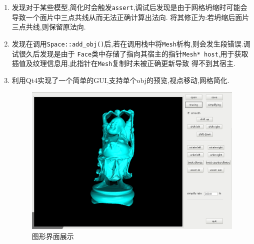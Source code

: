 \begin{enumerate}
\begin{figure}[H]
    \end{figure}

  \item 发现对于某些模型,简化时会触发\verb|assert|,调试后发现是由于网格坍缩时可能会导致一个面片中三点共线从而无法正确计算出法向.
    将其修正为:若坍缩后面片三点共线,则保留原法向.

  \item 发现在调用\verb|Space::add_obj()|后,若在调用栈中将\verb|Mesh|析构,则会发生段错误.调试很久后发现是由于
    \verb|Face|类中存储了指向其宿主的指针\verb|Mesh* host|,用于获取插值及纹理信息用,此指针在\verb|Mesh|复制时未被正确更新导致
    得不到其宿主.


  \item 利用Qt4实现了一个简单的GUI,支持单个obj的预览,视点移动,网格简化.

    \begin{figure}[H]
      \centering
      \includegraphics[scale=0.4]{img/gui.png}
      \caption{图形界面展示\label{fig:gui}}
    \end{figure}


\end{enumerate}
